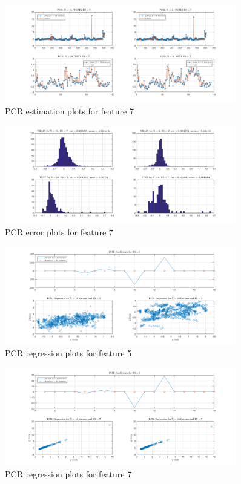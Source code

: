 \documentclass{article}
\begin{document}
\begin{figure}[H]
	\centering
	\includegraphics[width=0.9\textwidth]{pictures/PCR_F7_FINAL.png}
	\caption{PCR estimation plots for feature 7}\label{fig:PCR_F7_FINAL}
\end{figure}

\begin{figure}[H]
	\centering
	\includegraphics[width=0.9\textwidth]{pictures/PCR_F7_ERRORS.png}
	\caption{PCR error plots for feature 7}\label{fig:PCR_F7_ERRORS}
\end{figure}

\begin{figure}[H]
	\centering
	\includegraphics[width=0.9\textwidth]{pictures/PCR_F5_REGRESSION.png}
	\caption{PCR regression plots for feature 5}\label{fig:PCR_F5_REGRESSION}
\end{figure}

\begin{figure}[H]
	\centering
	\includegraphics[width=0.9\textwidth]{pictures/PCR_F7_REGRESSION.png}
	\caption{PCR regression plots for feature 7}\label{fig:PCR_F7_REGRESSION}
\end{figure}
\end{document}
